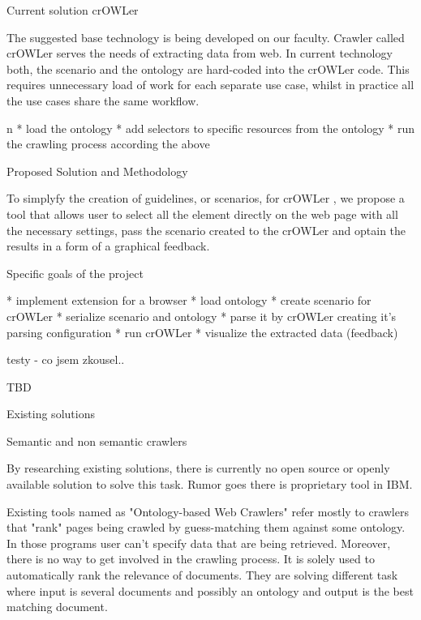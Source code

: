 \sec Current solution crOWLer

The suggested base technology is being developed on our faculty. Crawler called
crOWLer serves the needs of extracting data from web. In current technology
both, the scenario and the ontology are hard-coded into the crOWLer code. This
requires unnecessary load of work for each separate use case, whilst in
practice all the use cases share the same workflow. 

\begitems \style n
  * load the ontology
  * add selectors to specific resources from the ontology
  * run the crawling process according the above
\enditems


\sec Proposed Solution and Methodology

To simplyfy the creation of guidelines, or scenarios, for crOWLer , we propose
a tool that allows user to select all the element directly on the web page with
all the necessary settings, pass the scenario created to the crOWLer and optain
the results in a form of a graphical feedback. 

\sec Specific goals of the project

\begitems
  * implement extension for a browser
  * load ontology
  * create scenario for crOWLer 
  * serialize scenario and ontology
  * parse it by crOWLer creating it's parsing configuration
  * run crOWLer
  * visualize the extracted data (feedback)
\enditems


\sec testy - co jsem zkousel..

TBD

\chap Existing solutions


\sec Semantic and non semantic crawlers

By researching existing solutions, there is currently no open source or openly
available solution to solve this task. Rumor goes there is proprietary tool in IBM.

Existing tools named as "Ontology-based Web Crawlers" refer mostly to crawlers
that "rank" pages being crawled by guess-matching them against some ontology.
In those programs user can't specify data that are being retrieved. Moreover,
there is no way to get involved in the crawling process. It is solely used to
automatically rank the relevance of documents. They are solving different task
where input is several documents and possibly an ontology and output is the
best matching document. 

